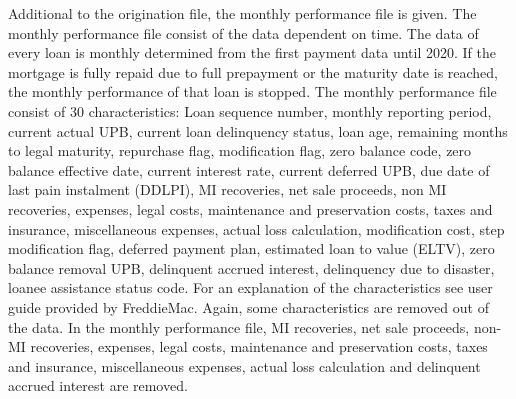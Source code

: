     Additional to the origination file, the monthly performance file is given. The monthly performance file consist of the data dependent on time. The data of every loan is monthly determined from the first payment data until 2020. If the mortgage is fully repaid due to full prepayment or the maturity date is reached, the monthly performance of that loan is stopped. The monthly performance file consist of 30 characteristics: Loan sequence number, monthly reporting period, current actual UPB, current loan delinquency status, loan age, remaining months to legal maturity, repurchase flag, modification flag, zero balance code, zero balance effective date, current interest rate, current deferred UPB, due date of last pain instalment (DDLPI), MI recoveries, net sale  proceeds, non MI recoveries, expenses, legal costs, maintenance and preservation costs, taxes and insurance, miscellaneous expenses, actual loss calculation, modification cost, step modification flag, deferred payment plan, estimated loan to value (ELTV), zero balance removal UPB, delinquent accrued interest, delinquency due to disaster, loanee assistance status code. For an explanation of the characteristics see user guide provided by FreddieMac. Again, some characteristics are removed out of the data. In the monthly performance file, MI recoveries, net sale proceeds, non-MI recoveries, expenses, legal costs, maintenance and preservation costs, taxes and insurance, miscellaneous expenses, actual loss calculation and delinquent accrued interest are removed. 


